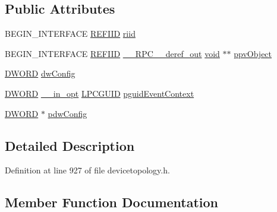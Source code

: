 \subsection*{Public Attributes}
\begin{DoxyCompactItemize}
\item 
B\+E\+G\+I\+N\+\_\+\+I\+N\+T\+E\+R\+F\+A\+CE \hyperlink{px__win__ds_8c_a80ec49c8ae61e234197d5071d2df497d}{R\+E\+F\+I\+ID} \hyperlink{struct_i_audio_channel_config_vtbl_ac0fa634790764a358b447fe14abb0cbb}{riid}
\item 
B\+E\+G\+I\+N\+\_\+\+I\+N\+T\+E\+R\+F\+A\+CE \hyperlink{px__win__ds_8c_a80ec49c8ae61e234197d5071d2df497d}{R\+E\+F\+I\+ID} \hyperlink{rpcsal_8h_a23bc188526f10656f9c79d950f6c3192}{\+\_\+\+\_\+\+R\+P\+C\+\_\+\+\_\+deref\+\_\+out} \hyperlink{sound_8c_ae35f5844602719cf66324f4de2a658b3}{void} $\ast$$\ast$ \hyperlink{struct_i_audio_channel_config_vtbl_ad5c78b661e2d4585aa47b1b0288886e9}{ppv\+Object}
\item 
\hyperlink{mapinls_8h_ad342ac907eb044443153a22f964bf0af}{D\+W\+O\+RD} \hyperlink{struct_i_audio_channel_config_vtbl_a06ea53f5bd6faf338de7b9afd46ded30}{dw\+Config}
\item 
\hyperlink{mapinls_8h_ad342ac907eb044443153a22f964bf0af}{D\+W\+O\+RD} \hyperlink{sal_8h_a9c2d0f2980e51b51bb405ee2a31a3353}{\+\_\+\+\_\+in\+\_\+opt} \hyperlink{pa__win__wasapi_8c_a9c061ab1f26db8746b3dab38991f48a0}{L\+P\+C\+G\+U\+ID} \hyperlink{struct_i_audio_channel_config_vtbl_ab528962f5adee33caaa6d29a49e3cb3e}{pguid\+Event\+Context}
\item 
\hyperlink{mapinls_8h_ad342ac907eb044443153a22f964bf0af}{D\+W\+O\+RD} $\ast$ \hyperlink{struct_i_audio_channel_config_vtbl_ac7531b2c1a36febb9e7cad486ccd3fa9}{pdw\+Config}
\end{DoxyCompactItemize}


\subsection{Detailed Description}


Definition at line 927 of file devicetopology.\+h.



\subsection{Member Function Documentation}
